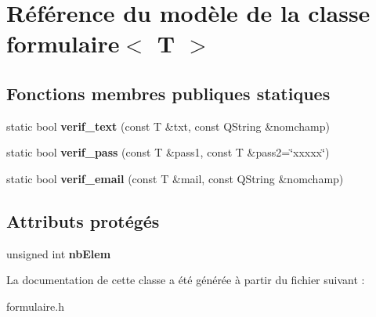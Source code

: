 \hypertarget{classformulaire}{\section{Référence du modèle de la classe formulaire$<$ T $>$}
\label{classformulaire}
}
\subsection*{Fonctions membres publiques statiques}
\begin{DoxyCompactItemize}
\item 
\hypertarget{classformulaire_a8d867d6ad49ef76d6ea867c629e4e11b}{static bool {\bfseries verif\+\_\+text} (const T \&txt, const Q\+String \&nomchamp)}\label{classformulaire_a8d867d6ad49ef76d6ea867c629e4e11b}

\item 
\hypertarget{classformulaire_a3b3eb187d90aaa43c0d0850f09446819}{static bool {\bfseries verif\+\_\+pass} (const T \&pass1, const T \&pass2=\char`\"{}xxxxx\char`\"{})}\label{classformulaire_a3b3eb187d90aaa43c0d0850f09446819}

\item 
\hypertarget{classformulaire_a88f12bb3ead2326e7574aa737ffba768}{static bool {\bfseries verif\+\_\+email} (const T \&mail, const Q\+String \&nomchamp)}\label{classformulaire_a88f12bb3ead2326e7574aa737ffba768}

\end{DoxyCompactItemize}
\subsection*{Attributs protégés}
\begin{DoxyCompactItemize}
\item 
\hypertarget{classformulaire_a9a01a0d127eeaf33e9bd14a74c6ceeeb}{unsigned int {\bfseries nb\+Elem}}\label{classformulaire_a9a01a0d127eeaf33e9bd14a74c6ceeeb}

\end{DoxyCompactItemize}


La documentation de cette classe a été générée à partir du fichier suivant \+:\begin{DoxyCompactItemize}
\item 
formulaire.\+h\end{DoxyCompactItemize}
